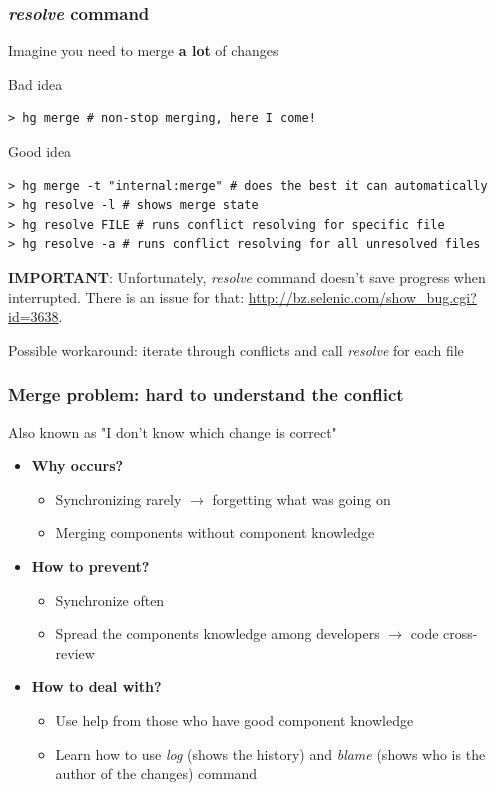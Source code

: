 \documentclass{beamer}
\begin{document}
\begin{frame}[fragile]
\frametitle{\textit{resolve} command}
Imagine you need to merge \textbf{a lot} of changes

\begin{exampleblock}{Bad idea}
\begin{verbatim}
> hg merge # non-stop merging, here I come!
\end{verbatim}
\end{exampleblock}

\begin{exampleblock}{Good idea}
\begin{Verbatim}[fontsize=\footnotesize]
> hg merge -t "internal:merge" # does the best it can automatically
> hg resolve -l # shows merge state
> hg resolve FILE # runs conflict resolving for specific file
> hg resolve -a # runs conflict resolving for all unresolved files
\end{Verbatim}
\end{exampleblock}
\textbf{IMPORTANT}: Unfortunately, \textit{resolve} command doesn't save progress when interrupted. There is an issue for that: \url{http://bz.selenic.com/show_bug.cgi?id=3638}. 

Possible workaround: iterate through conflicts and call \textit{resolve} for each file
\end{frame}

\begin{frame}
\frametitle{Merge problem: hard to understand the conflict}
Also known as "I don't know which change is correct"


\begin{itemize}
\item \textbf{Why occurs?}
\begin{itemize}
\item Synchronizing rarely $\to$ forgetting what was going on
\item Merging components without component knowledge
\end{itemize}
\item \textbf{How to prevent?}
\begin{itemize}
\item Synchronize often
\item Spread the components knowledge among developers $\to$ code cross-review
\end{itemize}
\item \textbf{How to deal with?}
\begin{itemize}
\item Use help from those who have good component knowledge
\item Learn how to use \textit{log} (shows the history) and \textit{blame} (shows who is the author of the changes) command
\end{itemize}
\end{itemize}
\end{frame}
\end{document}
